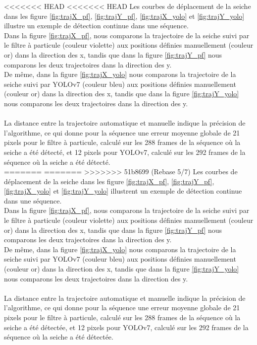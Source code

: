 <<<<<<< HEAD
<<<<<<< HEAD
Les courbes de déplacement de la seiche dans les figure \ref{fig:trajX_pf}, \ref{fig:trajY_pf}, \ref{fig:trajX_yolo} et \ref{fig:trajY_yolo} illustre un exemple de détection continue dans une séquence.\\
Dans la figure \ref{fig:trajX_pf}, nous comparons la trajectoire de la seiche suivi par le filtre à particule (couleur violette) aux positions définies manuellement (couleur or) dans la direction des x, tandis que dans la figure \ref{fig:trajY_pf} nous comparons les deux trajectoires dans la direction des y.\\
De même, dans la figure \ref{fig:trajX_yolo} nous comparons la trajectoire de la seiche suivi par YOLOv7 (couleur bleu) aux positions définies manuellement (couleur or) dans la direction des x, tandis que dans la figure \ref{fig:trajY_yolo} nous comparons les deux trajectoires dans la direction des y.\\
\\
La distance entre la trajectoire automatique et manuelle indique la précision de l'algorithme, ce qui donne pour la séquence une erreur moyenne globale de 21 pixels pour le filtre à particule, calculé sur les 288 frames de la séquence où la seiche a été détecté, et 12 pixels pour YOLOv7, calculé sur les 292 frames de la séquence où la seiche a été détecté.\\
=======
=======
>>>>>>> 51b8699 (Rebase 5/7)
Les courbes de déplacement de la seiche dans les figure \ref{fig:trajX_pf}, \ref{fig:trajY_pf}, \ref{fig:trajX_yolo} et \ref{fig:trajY_yolo} illustrent un exemple de détection continue dans une séquence.\\
Dans la figure \ref{fig:trajX_pf}, nous comparons la trajectoire de la seiche suivi par le filtre à particule (couleur violette) aux positions définies manuellement (couleur or) dans la direction des x, tandis que dans la figure \ref{fig:trajY_pf} nous comparons les deux trajectoires dans la direction des y.\\
De même, dans la figure \ref{fig:trajX_yolo} nous comparons la trajectoire de la seiche suivi par YOLOv7 (couleur bleu) aux positions définies manuellement (couleur or) dans la direction des x, tandis que dans la figure \ref{fig:trajY_yolo} nous comparons les deux trajectoires dans la direction des y.\\
\\
La distance entre la trajectoire automatique et manuelle indique la précision de l'algorithme, ce qui donne pour la séquence une erreur moyenne globale de 21 pixels pour le filtre à particule, calculé sur les 288 frames de la séquence où la seiche a été détectée, et 12 pixels pour YOLOv7, calculé sur les 292 frames de la séquence où la seiche a été détectée.\\
